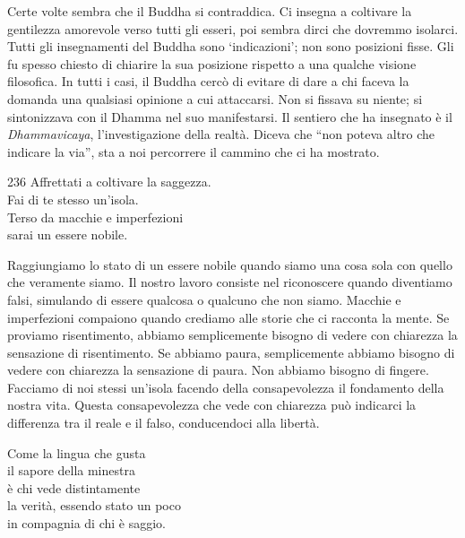 \begin{dhpRefl}
  Certe volte sembra che il Buddha si contraddica. Ci insegna a coltivare la
  gentilezza amorevole verso tutti gli esseri, poi sembra dirci che dovremmo
  isolarci. Tutti gli insegnamenti del Buddha sono `indicazioni'; non sono
  posizioni fisse. Gli fu spesso chiesto di chiarire la sua posizione rispetto a
  una qualche visione filosofica. In tutti i casi, il Buddha cercò di evitare di
  dare a chi faceva la domanda una qualsiasi opinione a cui attaccarsi. Non si
  fissava su niente; si sintonizzava con il Dhamma nel suo manifestarsi. Il
  sentiero che ha insegnato è il \emph{Dhammavicaya}, l'investigazione della
  realtà. Diceva che ``non poteva altro che indicare la via'', sta a noi
  percorrere il cammino che ci ha mostrato.
\end{dhpRefl}


\begin{dhpVerse}{236}
\label{dhp-236}
Affrettati a coltivare la saggezza.\\
Fai di te stesso un'isola.\\
Terso da macchie e imperfezioni\\
sarai un essere nobile.
\end{dhpVerse}

\begin{dhpRefl}
  Raggiungiamo lo stato di un essere nobile quando siamo una cosa sola con
  quello che veramente siamo. Il nostro lavoro consiste nel riconoscere quando
  diventiamo falsi, simulando di essere qualcosa o qualcuno che non siamo.
  Macchie e imperfezioni compaiono quando crediamo alle storie che ci racconta
  la mente. Se proviamo risentimento, abbiamo semplicemente bisogno di vedere
  con chiarezza la sensazione di risentimento. Se abbiamo paura, semplicemente
  abbiamo bisogno di vedere con chiarezza la sensazione di paura. Non abbiamo
  bisogno di fingere. Facciamo di noi stessi un'isola facendo della
  consapevolezza il fondamento della nostra vita. Questa consapevolezza che vede
  con chiarezza può indicarci la differenza tra il reale e il falso,
  conducendoci alla libertà.
\end{dhpRefl}


\begin{dhpVerse}{65}
\label{dhp-65}
Come la lingua che gusta\\
il sapore della minestra\\
è chi vede distintamente\\
la verità, essendo stato un poco\\
in compagnia di chi è saggio.
\end{dhpVerse}

